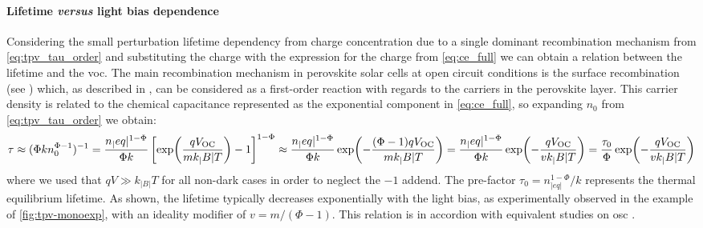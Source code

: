 		\paragraph{Lifetime \textsl{versus} light bias dependence}\label{tpv_tau_vs_intensity}
		Considering the small perturbation lifetime dependency from charge concentration due to a single dominant recombination mechanism from \cref{eq:tpv_tau_order} and substituting the charge with the expression for the charge from \cref{eq:ce_full} we can obtain a relation between the lifetime and the \gls{voc}.
		The main recombination mechanism in perovskite solar cells at open circuit conditions is the surface recombination (see ) which, as described in , can be considered as a first\hyp{}order reaction with regards to the carriers \label{tpv_chemical_charge}in the perovskite layer.
		This carrier density is related to the chemical capacitance represented as the exponential component in \cref{eq:ce_full}, so expanding $n_0$ from \cref{eq:tpv_tau_order} we obtain:
		\begin{dmath}\label{eq:tpv_tau_vs_intensity}
			\tau \approx (\Phi k n_0^{\Phi-1})^{-1} = \frac{n_|eq|^{1-\Phi}}{\Phi k} \left[\exp(\frac{q\voc}{mk_|B|T}) - 1\right]^{1-\Phi} \approx \frac{n_|eq|^{1-\Phi}}{\Phi k} \exp(-\frac{(\Phi-1)q\voc}{mk_|B|T}) = \frac{n_|eq|^{1-\Phi}}{\Phi k} \exp(-\frac{q\voc}{vk_|B|T}) = \frac{\tau_0}{\Phi} \exp(-\frac{q\voc}{vk_|B|T})
		\end{dmath}
		where we used that $qV \gg k_|B|T$ for all non-dark cases in order to neglect the $-1$ addend.
		The pre\hyp{}factor $\tau_0 = n_|eq|^{1-\Phi}/k$ represents the thermal equilibrium lifetime.
		As shown, the lifetime typically decreases exponentially with the light bias, as experimentally observed in the example of \cref{fig:tpv-monoexp}, with an ideality modifier of $v = m/(\Phi-1)$.
		This relation is in accordion with equivalent studies on \gls{osc} \cite{Shuttle2008,Shuttle2008d,Credgington2011}.

